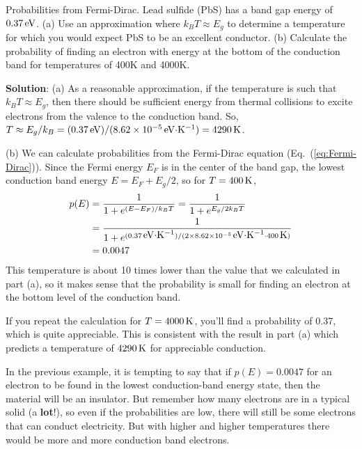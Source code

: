 \begin{example}{Probabilities from Fermi-Dirac.}
\label{ex:FD}
Lead sulfide (PbS) has a band gap energy of $0.37\,\mbox{eV}$. (a) Use an
approximation where $k_BT \approx E_g$ to determine a temperature for which you 
would expect PbS to be an excellent conductor.
(b) Calculate the
probability of finding an electron with energy at the bottom of the
conduction band for temperatures of 400K and 4000K.

{\bf Solution}: (a) As a reasonable approximation, if the temperature is
such that $k_BT \approx E_g$, then there should be sufficient energy
from thermal collisions to excite electrons from the valence to the conduction
band.  So, 
$T \approx E_g/k_B 
= (0.37\,\mbox{eV})/(8.62\times 10^{-5}\,\mbox{eV$\cdot$K$^{-1}$})  
= 4290\,\mbox{K}$.

(b) We can calculate probabilities from the Fermi-Dirac equation
(Eq.~(\ref{eq:Fermi-Dirac})). Since the Fermi energy $E_F$ is in the center
of the band gap, the lowest conduction band energy $E = E_F + E_g/2$,
so for $T = 400\,\mbox{K}$,
\begin{align}
p(E) &= \frac{1}{1+e^{(E-E_F)/k_BT}} = \frac{1}{1+e^{E_g/2k_BT}}\nonumber \\
&= \frac{1}{1+e^{(0.37\,\mbox{eV$\cdot$K$^{-1}$})/(2 \times 8.62\times 10^{-5}\,\mbox{eV$\cdot$K$^{-1}$}\cdot 400\,\mbox{K})}}\nonumber \\ 
&= 0.0047 
\end{align}
This temperature is about 10 times lower than the value that we calculated in
part (a), so it makes sense that the probability is small for finding an 
electron at the bottom level of the conduction band.

If you repeat the calculation for $T = 4000\,\mbox{K}$, you'll find 
a probability of 0.37, which is quite appreciable. This is consistent 
with the result in part (a) which predicts a temperature of $4290\,\mbox{K}$ 
for appreciable conduction.

\end{example}

In the previous example, it is tempting to say that if $p(E) = 0.0047$ for
an electron to be found in the lowest conduction-band energy state, then
the material will be an insulator. But remember how many electrons are
in a typical solid (a {\bf lot}!), so even if the probabilities are low,
there will still be some electrons that can conduct electricity. But 
with higher and higher temperatures there
would be more and more conduction band electrons.

